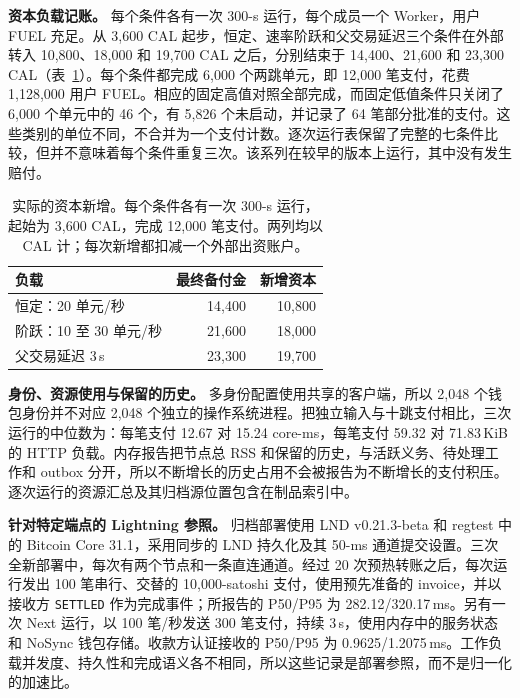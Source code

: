 \noindent\textbf{资本负载记账。}
每个条件各有一次 300-s 运行，每个成员一个 Worker，用户 FUEL 充足。从 3,600 CAL 起步，恒定、速率阶跃和父交易延迟三个条件在外部转入 10,800、18,000 和 19,700 CAL 之后，分别结束于 14,400、21,600 和 23,300 CAL（表~\ref{tab:eval-capital}）。每个条件都完成 6,000 个两跳单元，即 12,000 笔支付，花费 1,128,000 用户 FUEL。相应的固定高值对照全部完成，而固定低值条件只关闭了 6,000 个单元中的 46 个，有 5,826 个未启动，并记录了 64 笔部分批准的支付。这些类别的单位不同，不合并为一个支付计数。逐次运行表保留了完整的七条件比较，但并不意味着每个条件重复三次。该系列在较早的版本上运行，其中没有发生赔付。

\begin{table}[t]
  \caption{实际的资本新增。每个条件各有一次 300-s 运行，起始为 3,600 CAL，完成 12,000 笔支付。两列均以 CAL 计；每次新增都扣减一个外部出资账户。}
  \label{tab:eval-capital}
  \centering
  \small
  \begin{tabular}{@{}lrr@{}}
    \toprule
    负载 & 最终备付金 & 新增资本 \\
    \midrule
    恒定：20 单元/秒 & 14,400 & 10,800 \\
    阶跃：10 至 30 单元/秒 & 21,600 & 18,000 \\
    父交易延迟 3\,s & 23,300 & 19,700 \\
    \bottomrule
  \end{tabular}
\end{table}

\noindent\textbf{身份、资源使用与保留的历史。}
多身份配置使用共享的客户端，所以 2,048 个钱包身份并不对应 2,048 个独立的操作系统进程。把独立输入与十跳支付相比，三次运行的中位数为：每笔支付 12.67 对 15.24 core-ms，每笔支付 59.32 对 71.83\,KiB 的 HTTP 负载。内存报告把节点总 RSS 和保留的历史，与活跃义务、待处理工作和 outbox 分开，所以不断增长的历史占用不会被报告为不断增长的支付积压。逐次运行的资源汇总及其归档源位置包含在制品索引中。

\noindent\textbf{针对特定端点的 Lightning 参照。}
归档部署使用 LND v0.21.3-beta 和 regtest 中的 Bitcoin Core 31.1，采用同步的 LND 持久化及其 50-ms 通道提交设置。三次全新部署中，每次有两个节点和一条直连通道。经过 20 次预热转账之后，每次运行发出 100 笔串行、交替的 10,000-satoshi 支付，使用预先准备的 invoice，并以接收方 \texttt{SETTLED} 作为完成事件；所报告的 P50/P95 为 282.12/320.17\,ms。另有一次 Next 运行，以 100 笔/秒发送 300 笔支付，持续 3\,s，使用内存中的服务状态和 NoSync 钱包存储。收款方认证接收的 P50/P95 为 0.9625/1.2075\,ms。工作负载并发度、持久性和完成语义各不相同，所以这些记录是部署参照，而不是归一化的加速比。

